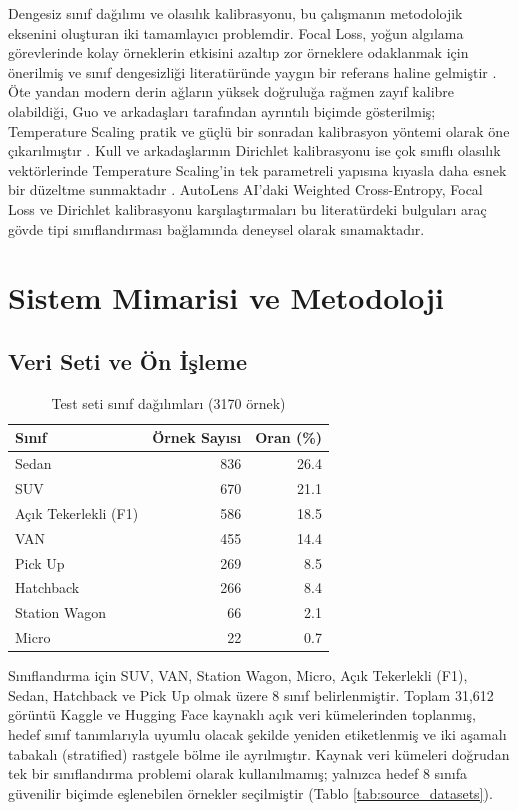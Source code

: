 \documentclass[conference]{IEEEtran}
\begin{document}
Dengesiz sınıf dağılımı ve olasılık kalibrasyonu, bu çalışmanın metodolojik eksenini oluşturan iki tamamlayıcı problemdir. Focal Loss, yoğun algılama görevlerinde kolay örneklerin etkisini azaltıp zor örneklere odaklanmak için önerilmiş ve sınıf dengesizliği literatüründe yaygın bir referans haline gelmiştir \cite{lin2017focal}. Öte yandan modern derin ağların yüksek doğruluğa rağmen zayıf kalibre olabildiği, Guo ve arkadaşları tarafından ayrıntılı biçimde gösterilmiş; Temperature Scaling pratik ve güçlü bir sonradan kalibrasyon yöntemi olarak öne çıkarılmıştır \cite{guo2017calibration}. Kull ve arkadaşlarının Dirichlet kalibrasyonu ise çok sınıflı olasılık vektörlerinde Temperature Scaling'in tek parametreli yapısına kıyasla daha esnek bir düzeltme sunmaktadır \cite{kull2019beyond}. AutoLens AI'daki Weighted Cross-Entropy, Focal Loss ve Dirichlet kalibrasyonu karşılaştırmaları bu literatürdeki bulguları araç gövde tipi sınıflandırması bağlamında deneysel olarak sınamaktadır.

\section{Sistem Mimarisi ve Metodoloji}

\subsection{Veri Seti ve Ön İşleme}

\begin{table}[h]
\centering
\small
\caption{Test seti sınıf dağılımları (3170 örnek)}
\label{tab:dataset_dist}
\begin{tabular}{@{}lrr@{}}
\toprule
\textbf{Sınıf} & \textbf{Örnek Sayısı} & \textbf{Oran (\%)} \\ \midrule
Sedan & 836 & 26.4 \\
SUV & 670 & 21.1 \\
Açık Tekerlekli (F1) & 586 & 18.5 \\
VAN & 455 & 14.4 \\
Pick Up & 269 & 8.5 \\
Hatchback & 266 & 8.4 \\
Station Wagon & 66 & 2.1 \\
Micro & 22 & 0.7 \\ \bottomrule
\end{tabular}
\end{table}
Sınıflandırma için SUV, VAN, Station Wagon, Micro, Açık Tekerlekli (F1), Sedan, Hatchback ve Pick Up olmak üzere 8 sınıf belirlenmiştir. Toplam 31,612 görüntü Kaggle ve Hugging Face kaynaklı açık veri kümelerinden toplanmış, hedef sınıf tanımlarıyla uyumlu olacak şekilde yeniden etiketlenmiş ve iki aşamalı tabakalı (stratified) rastgele bölme ile ayrılmıştır. Kaynak veri kümeleri doğrudan tek bir sınıflandırma problemi olarak kullanılmamış; yalnızca hedef 8 sınıfa güvenilir biçimde eşlenebilen örnekler seçilmiştir (Tablo \ref{tab:source_datasets}).
\end{document}
